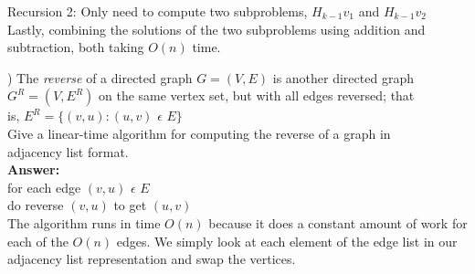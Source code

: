\documentclass{article}
\begin{document}
Recursion 2: Only need to compute two subproblems, $H_{k - 1}v_{1}$ and $H_{k - 1}v_{2}$ \\

Lastly, combining the solutions of the two subproblems using addition and subtraction, both taking $O(n)$ time. 

\vspace{.3in}
) The \textit{reverse} of a directed graph $G = (V, E)$ is another directed graph \\
\indent $G^{R} = (V, E^{R})$ on the same vertex set, but with all edges reversed; that \\
\indent is, $E^R =\big\{(v, u) : (u, v)$ $\epsilon$ $E\big\}$ \\

Give a linear-time algorithm for computing the reverse of a graph in \\
adjacency list format. \\
\vspace{.1in}
{\bf Answer:} \\
 for each edge $(v, u)$ $\epsilon$ $E$ \\
 \indent do reverse $(v, u)$ to get $(u, v)$ \\

The algorithm runs in time $O(n)$ because it does a constant amount of work for each of the $O(n)$ edges. We simply look at each element of the edge list in our adjacency list representation and swap the vertices. \\
\end{document}
